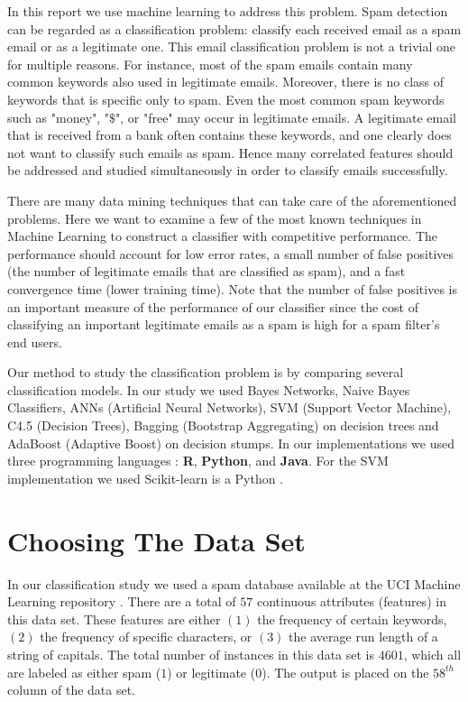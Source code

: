 \documentclass[11pt,oneside,reqno]{amsart}
\theoremstyle{definition}
\theoremstyle{definition}
\theoremstyle{remark}
\numberwithin{equation}{section}
\numberwithin{equation}{section}
\begin{document}
In this report we use machine learning to address this problem. Spam detection can be regarded as a classification problem: classify each received email as a spam email or as a legitimate one. This email classification problem is not a trivial one for multiple reasons. For instance, most of the spam emails contain many common keywords also used in legitimate emails. Moreover, there is no class of keywords that is specific only to spam. Even the most common spam keywords such as "money", "$\$$", or "free" may occur in legitimate emails. A legitimate email that is received from a bank often contains these keywords, and one clearly does not want to classify such emails as spam. Hence many correlated features should be addressed and studied simultaneously in order to classify emails successfully.

There are many data mining techniques that can take care of the aforementioned problems. Here we want to examine a few of the most known techniques in Machine Learning to construct a classifier with competitive performance. The performance should account for low error rates, a small number of false positives (the number of legitimate emails that are classified as spam), and a fast convergence time (lower training time). Note that the number of false positives is an important measure of the performance of our classifier since the cost of classifying an important legitimate emails as a spam is high for a spam filter's end users.

Our method to study the classification problem is by comparing several classification models. In our study we used Bayes Networks, Naive Bayes Classifiers, ANNs (Artificial Neural Networks), SVM (Support Vector Machine), C4.5 (Decision Trees), Bagging (Bootstrap Aggregating) on decision trees and AdaBoost (Adaptive Boost) on decision stumps. In our implementations we used three programming languages : \textbf{R}, \textbf{Python}, and \textbf{Java}. For the SVM implementation we used Scikit-learn is a Python \cite{scikit-learn}.

\section{Choosing The Data Set}

In our classification study we used a spam database available at the UCI Machine Learning repository \cite{spam}. There are a total of $57$ continuous attributes (features) in this data set. These features are either $(1)$ the frequency of certain keywords, $(2)$ the frequency of specific characters, or $(3)$ the average run length of a string of capitals. The total number of instances in this data set is $4601$, which all are labeled as either spam ($1$) or legitimate ($0$). The output is placed on the $58^{th}$ column of the data set.
\end{document}
